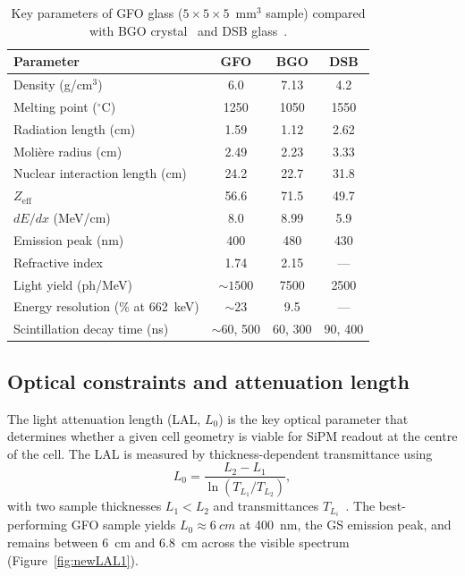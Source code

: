 \begin{table}[htbp]
\centering
\caption{Key parameters of GFO glass ($5\times5\times5$~mm$^{3}$
sample) compared with BGO crystal~\cite{BGO} and DSB
glass~\cite{Dormenev:2021vtn}.}
\label{tab:GS1}
\begin{tabular}{lccc}
\toprule
\textbf{Parameter} & \textbf{GFO} & \textbf{BGO} & \textbf{DSB} \\
\midrule
Density (g/cm$^{3}$)                       & 6.0      & 7.13  & 4.2   \\
Melting point ($^{\circ}$C)                 & 1250     & 1050  & 1550  \\
Radiation length (cm)                       & 1.59     & 1.12  & 2.62  \\
Moli\`{e}re radius (cm)                    & 2.49     & 2.23  & 3.33  \\
Nuclear interaction length (cm)             & 24.2     & 22.7  & 31.8  \\
$Z_{\mathrm{eff}}$                          & 56.6     & 71.5  & 49.7  \\
$dE/dx$ (MeV/cm)                            & 8.0      & 8.99  & 5.9   \\
Emission peak (nm)                          & 400      & 480   & 430   \\
Refractive index                            & 1.74     & 2.15  & ---   \\
Light yield (ph/MeV)                        & ${\sim}1500$ & 7500  & 2500  \\
Energy resolution (\% at \SI{662}{keV})     & ${\sim}23$   & 9.5   & ---   \\
Scintillation decay time (ns)               & ${\sim}60$, 500 & 60, 300 & 90, 400 \\
\bottomrule
\end{tabular}
\end{table}

\subsection{Optical constraints and attenuation length}
\label{subsec:attenuation}

The light attenuation length (LAL, $L_{0}$) is the key optical
parameter that determines whether a given cell geometry is viable for
SiPM readout at the centre of the cell.
The LAL is measured by thickness-dependent transmittance using
\begin{equation}
\label{eq:LAL}
L_{0} = \frac{L_{2}-L_{1}}{\ln(T_{L_{1}}/T_{L_{2}})},
\end{equation}
with two sample thicknesses $L_{1}<L_{2}$ and transmittances
$T_{L_{i}}$~\cite{Zhu:1996tt}.
The best-performing GFO sample yields
$L_{0}\approx\SI{6}{cm}$ at \SI{400}{nm}, the GS emission peak, and
remains between \SI{6}{cm} and \SI{6.8}{cm} across the visible
spectrum (Figure~\ref{fig:newLAL1}).

